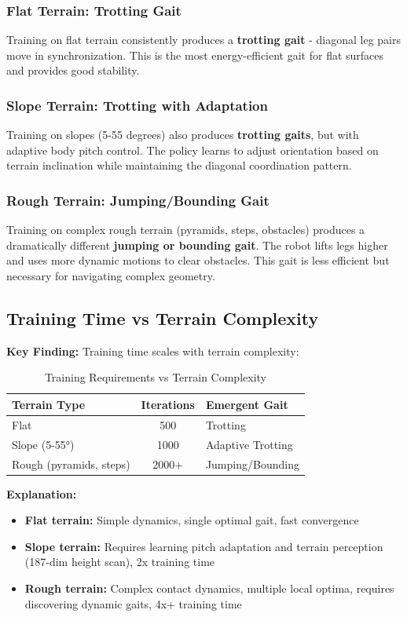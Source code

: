\documentclass[12pt,a4paper]{article}
\begin{document}
\subsubsection{Flat Terrain: Trotting Gait}
Training on flat terrain consistently produces a \textbf{trotting gait} - diagonal leg pairs move in synchronization. This is the most energy-efficient gait for flat surfaces and provides good stability.

\subsubsection{Slope Terrain: Trotting with Adaptation}
Training on slopes (5-55 degrees) also produces \textbf{trotting gaits}, but with adaptive body pitch control. The policy learns to adjust orientation based on terrain inclination while maintaining the diagonal coordination pattern.

\subsubsection{Rough Terrain: Jumping/Bounding Gait}
Training on complex rough terrain (pyramids, steps, obstacles) produces a dramatically different \textbf{jumping or bounding gait}. The robot lifts legs higher and uses more dynamic motions to clear obstacles. This gait is less efficient but necessary for navigating complex geometry.

\subsection{Training Time vs Terrain Complexity}

\textbf{Key Finding:} Training time scales with terrain complexity:

\begin{table}[h]
\centering
\caption{Training Requirements vs Terrain Complexity}
\begin{tabular}{|l|c|l|}
\hline
\textbf{Terrain Type} & \textbf{Iterations} & \textbf{Emergent Gait} \\
\hline
Flat & 500 & Trotting \\
Slope (5-55°) & 1000 & Adaptive Trotting \\
Rough (pyramids, steps) & 2000+ & Jumping/Bounding \\
\hline
\end{tabular}
\end{table}

\textbf{Explanation:}
\begin{itemize}
    \item \textbf{Flat terrain:} Simple dynamics, single optimal gait, fast convergence
    \item \textbf{Slope terrain:} Requires learning pitch adaptation and terrain perception (187-dim height scan), 2x training time
    \item \textbf{Rough terrain:} Complex contact dynamics, multiple local optima, requires discovering dynamic gaits, 4x+ training time
\end{itemize}
\end{document}
